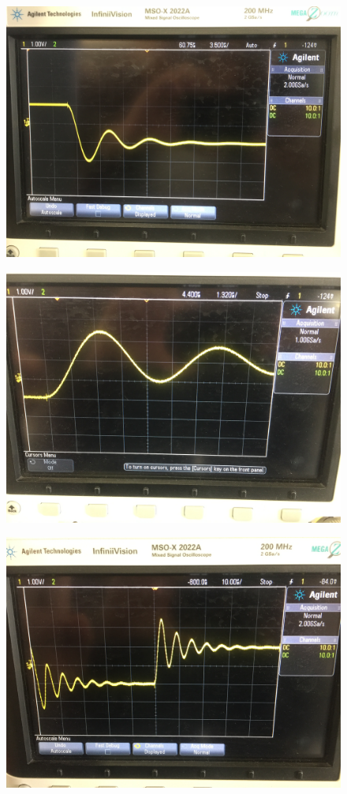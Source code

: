 \documentclass{article}
\begin{document}
\begin{figure}[H]
	\centering
	\includegraphics[width=0.7\linewidth]{IMG_6441}
	\label{fig:img6441}
\end{figure}
\begin{figure}[H]
	\centering
	\includegraphics[width=0.7\linewidth]{IMG_6442}
	\label{fig:img6442}
\end{figure}
\begin{figure}[H]
	\centering
	\includegraphics[width=0.7\linewidth]{IMG_6443}
	\label{fig:img6443}
\end{figure}
\end{document}
